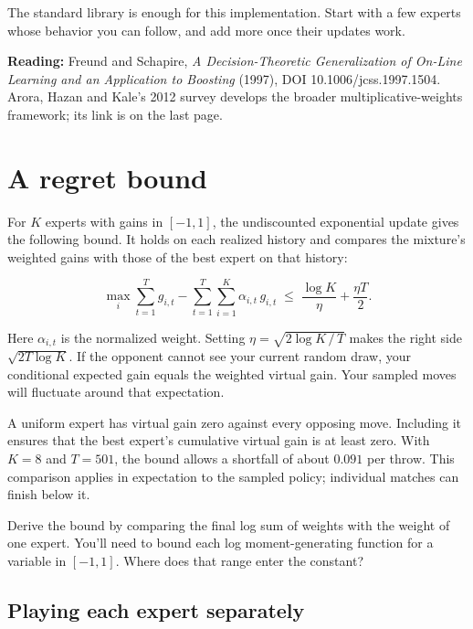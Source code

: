 \documentclass[11pt]{article}
\begin{document}
The standard library is enough for this implementation. Start with a few experts whose behavior you can follow, and add more once their updates work.


\textbf{Reading:} Freund and Schapire, \emph{A Decision-Theoretic Generalization of On-Line Learning and an Application to Boosting} (1997), DOI 10.1006/jcss.1997.1504. Arora, Hazan and Kale's 2012 survey develops the broader multiplicative-weights framework; its link is on the last page.
\par
\clearpage
\section*{A regret bound}

\begin{context}
For $K$ experts with gains in $[-1,1]$, the undiscounted exponential update gives the following bound. It holds on each realized history and compares the mixture's weighted gains with those of the best expert on that history:

\end{context}

\[
\max_i\sum_{t=1}^{T}g_{i,t}
  - \sum_{t=1}^{T}\sum_{i=1}^{K}\alpha_{i,t}\,g_{i,t}
\;\leq\; \frac{\log K}{\eta}+\frac{\eta T}{2}.
\]

Here $\alpha_{i,t}$ is the normalized weight. Setting $\eta=\sqrt{2\log K\,/\,T}$ makes the right side $\sqrt{2T\log K}$. If the opponent cannot see your current random draw, your conditional expected gain equals the weighted virtual gain. Your sampled moves will fluctuate around that expectation.



A uniform expert has virtual gain zero against every opposing move. Including it ensures that the best expert's cumulative virtual gain is at least zero. With $K=8$ and $T=501$, the bound allows a shortfall of about $0.091$ per throw. This comparison applies in expectation to the sampled policy; individual matches can finish below it.


Derive the bound by comparing the final log sum of weights with the weight of one expert. You'll need to bound each log moment-generating function for a variable in $[-1,1]$. Where does that range enter the constant?


\subsection*{Playing each expert separately}
\end{document}
